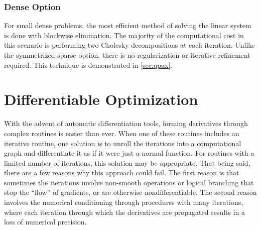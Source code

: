 \subsubsection{Dense Option}
For small dense problems, the most efficient method of solving the linear system is done with blockwise elimination. The majority of the computational cost in this scenario is performing two Cholesky decompositions at each iteration. Unlike the symmetrized sparse option, there is no regularization or iterative refinement required. This technique is demonstrated in \ref{sec:qpax}.
%
%
\section{Differentiable Optimization}
%
%
With the advent of automatic differentiation tools, forming derivatives through complex routines is easier than ever. When one of these routines includes an iterative routine, one solution is to unroll the iterations into a computational graph and differentiate it as if it were just a normal function. For routines with a limited number of iterations, this solution may be appropriate. That being said, there are a few reasons why this approach could fail. The first reason is that sometimes the iterations involve non-smooth operations or logical branching that stop the ``flow'' of gradients, or are otherwise nondifferentiable. The second reason involves the numerical conditioning through procedures with many iterations, where each iteration through which the derivatives are propagated results in a loss of numerical precision. 
%
%
